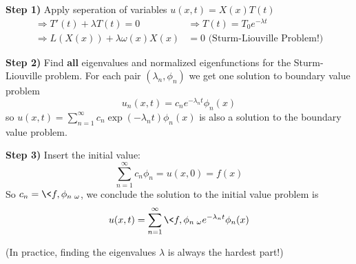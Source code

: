 \textbf{Step 1)} Apply seperation of variables
$u(x,t)=X(x)T(t)$
\begin{align*}
\Rightarrow T'(t)+\lambda T(t) = 0 &\Rightarrow T(t)=T_{0}e^{-\lambda t}\\
\Rightarrow L(X(x))+\lambda \omega(x)X(x)&=0\text{ (Sturm-Liouville Problem!)}
\end{align*}

\textbf{Step 2)} Find \textbf{all} eigenvalues and
normalized eigenfunctions for the Sturm-Liouville
problem. For each pair $(\lambda_n,\phi_n)$ we get one
solution to boundary value problem
\begin{equation}
u_{n}(x,t) = c_{n}e^{-\lambda_{n}t}\phi_{n}(x)
\end{equation}
so $u(x,t) =
\sum^{\infty}_{n=1}c_{n}\exp(-\lambda_{n}t)\phi_{n}(x)$ is
also a solution to the boundary value problem.

\textbf{Step 3)} Insert the initial value:
\begin{equation}
\sum^{\infty}_{n=1}c_{n}\phi_{n} = u(x,0) = f(x)
\end{equation}
So $c_n = \<f,\phi_n\>_{\omega}$, we conclude the solution
to the initial value problem is
\begin{equation}
u(x,t) =
\sum^{\infty}_{n=1}\<f,\phi_{n}\>_{\omega}e^{-\lambda_{n}t}\phi_{n}(x)
\end{equation}

(In practice, finding the eigenvalues $\lambda$ is always
the hardest part!)

